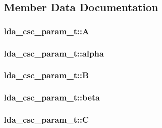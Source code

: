 \subsection{Member Data Documentation}
\hypertarget{structlda__csc__param__t_a824d8e3f5f92c9a46facd29b42f4b759}{
\subsubsection[{A}]{ lda\-\_\-csc\-\_\-param\-\_\-t\-::\-A}}\label{structlda__csc__param__t_a824d8e3f5f92c9a46facd29b42f4b759}
\hypertarget{structlda__csc__param__t_ae3e55b8053c54fcc37933beee8b2fd73}{
\subsubsection[{alpha}]{ lda\-\_\-csc\-\_\-param\-\_\-t\-::alpha}}\label{structlda__csc__param__t_ae3e55b8053c54fcc37933beee8b2fd73}
\hypertarget{structlda__csc__param__t_a6020a5f5a91014866dc264a5ab44dd80}{
\subsubsection[{B}]{ lda\-\_\-csc\-\_\-param\-\_\-t\-::\-B}}\label{structlda__csc__param__t_a6020a5f5a91014866dc264a5ab44dd80}
\hypertarget{structlda__csc__param__t_aa5b6c3192e37f2b55797f1106ce4ed29}{
\subsubsection[{beta}]{ lda\-\_\-csc\-\_\-param\-\_\-t\-::beta}}\label{structlda__csc__param__t_aa5b6c3192e37f2b55797f1106ce4ed29}
\hypertarget{structlda__csc__param__t_ac2d99567d9f66f8e4a063e5f2afa7906}{
\subsubsection[{C}]{ lda\-\_\-csc\-\_\-param\-\_\-t\-::\-C}}\label{structlda__csc__param__t_ac2d99567d9f66f8e4a063e5f2afa7906}
